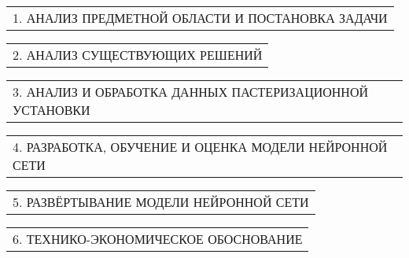 \documentclass[12pt, А4, twoside]{article}
\begin{document}
\begin{FlushLeft}
    \vspace{-0.1 cm}

    \begin{tabular}{p{17.25cm}}
        \hspace{0.3cm} \textsf{1. АНАЛИЗ ПРЕДМЕТНОЙ ОБЛАСТИ И ПОСТАНОВКА ЗАДАЧИ} \vspace{0pt} \hline \\
    \end{tabular}

    \vspace{-0.1 cm}

    \begin{tabular}{p{17.25cm}}
        \hspace{0.3cm} \textsf{2. АНАЛИЗ СУЩЕСТВУЮЩИХ РЕШЕНИЙ} \vspace{0pt} \hline \\
    \end{tabular}

    \vspace{-0.1 cm}

    \begin{tabular}{p{17.25cm}}
        \hspace{0.3cm} \textsf{3. АНАЛИЗ И ОБРАБОТКА ДАННЫХ ПАСТЕРИЗАЦИОННОЙ УСТАНОВКИ} \vspace{0pt} \hline \\
    \end{tabular}

    \vspace{-0.1 cm}

    \begin{tabular}{p{17.25cm}}
        \hspace{0.3cm} \textsf{4. РАЗРАБОТКА, ОБУЧЕНИЕ И ОЦЕНКА МОДЕЛИ НЕЙРОННОЙ СЕТИ} \vspace{0pt} \hline \\
    \end{tabular}

    \vspace{-0.1 cm}

    \begin{tabular}{p{17.25cm}}
        \hspace{0.3cm} \textsf{5. РАЗВЁРТЫВАНИЕ МОДЕЛИ НЕЙРОННОЙ СЕТИ} \vspace{0pt} \hline \\
    \end{tabular}

    \vspace{-0.1 cm}

    \begin{tabular}{p{17.25cm}} 
        \hspace{0.3cm} \textsf{6. ТЕХНИКО-ЭКОНОМИЧЕСКОЕ ОБОСНОВАНИЕ} \vspace{1pt} \hline \\
    \end{tabular}  


\end{FlushLeft}
\end{document}
